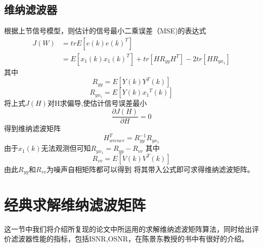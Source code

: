 \subsection{维纳滤波器}
	根据上节信号模型，则估计的信号最小二乘误差（MSE)的表达式
\begin{align}
	J(W) &=tr{E[e(k)e(k)^T]}\\ &=E[x_1(k)x_1(k)^T]+tr[HR_{yy}H^T]-2tr[HR_{yx_1}]
\end{align}
其中
\begin{equation}
	R_{yy}=E[Y(k)Y^T(k)]
\end{equation}
\begin{equation}
	R_{yx_1}=E[Y(k){x_1}^T(k)]
\end{equation} 
将上式$J(H)$对H求偏导,使估计信号误差最小
\begin{equation}
	\frac{\partial J(H)}{\partial H}=0
\end{equation}
得到维纳滤波矩阵
\begin{equation}
	H^T_{wiener}=R^{-1}_{yy}R_{yx_1}
\end{equation}
由于$x_1(k)$无法观测但可知$R_{yx_1} =R_{yy}-R_{vv}$ \cite{ref5}
其中
\begin{equation}
	R_{vv}=E[V(k)V^T(k)] \label{4}
\end{equation}
由此$R_{yy}$和$R_{vv}$为噪声自相矩阵都可以得到
将其带入公式即可求得维纳滤波矩阵。
\section{经典求解维纳滤波矩阵}
这一节中我们将介绍所复现的论文中所运用的求解维纳滤波矩阵算法，同时给出评价滤波器性能的指标，包括ISNR,OSNR，在陈景东教授的书中有很好的介绍。

